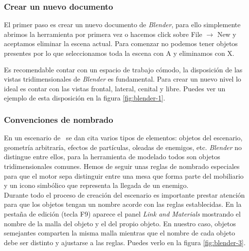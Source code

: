 \subsubsection*{Crear un nuevo documento}

El primer paso es crear un nuevo documento de \textit{Blender}, para ello
simplemente abrimos la herramienta por primera vez o hacemos click sobre
File $\rightarrow$ New y aceptamos eliminar la escena actual. Para comenzar
no podemos tener objetos presentes por lo que seleccionamos toda la escena
con A y eliminamos con X.


Es recomendable contar con un espacio de trabajo cómodo, la disposición
de las vistas tridimensionales de \textit{Blender} es fundamental. Para
crear un nuevo nivel lo ideal es contar con las vistas frontal, lateral,
cenital y libre. Puedes ver un ejemplo de esta disposición en la figura
\ref{fig:blender-1}.

\subsubsection*{Convenciones de nombrado}

En un escenario de \juego\ se dan cita varios tipos de elementos: objetos
del escenario, geometría arbitraría, efectos de partículas, oleadas de enemigos,
etc. \textit{Blender} no distingue entre ellos, para la herramienta de modelado
todos son objetos tridimensionales comunes. Hemos de seguir unas reglas de
nombrado especiales para que el motor sepa distinguir entre una mesa que
forma parte del mobiliario y un icono simbólico que representa la llegada
de un enemigo.\\

Durante todo el proceso de creación del escenario es importante prestar
atención para que los objetos tengan un nombre acorde con las reglas
establecidas. En la pestaña de edición (tecla F9) aparece el panel
\textit{Link and Materials} mostrando el nombre de la malla del objeto
y el del propio objeto. En nuestro caso, objetos semejantes comparten
la misma malla mientras que el nombre de cada objeto debe ser distinto
y ajustarse a las reglas. Puedes verlo en la figura \ref{fig:blender-3}.


